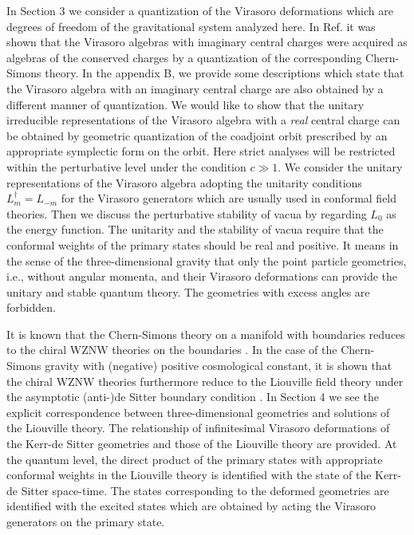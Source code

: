 \documentclass[a4paper,11pt]{article}
\begin{document}
In Section 3 we consider a quantization of the Virasoro deformations 
which are degrees of freedom of the gravitational system 
analyzed here.
In Ref.\cite{Park} it was shown that the Virasoro algebras 
with imaginary central charges were acquired as algebras 
of the conserved charges by a quantization of the corresponding 
Chern-Simons theory.
In the appendix B, we provide some descriptions which state 
that the Virasoro algebra with an imaginary central charge 
are also obtained by a different manner of quantization.
We would like to show that the unitary irreducible representations of 
the Virasoro algebra with a {\it real} central charge can be obtained 
by geometric quantization of the coadjoint orbit prescribed by 
an appropriate symplectic form on the orbit.
Here strict analyses will be restricted within the perturbative level 
under the condition $c\gg 1$.
We consider the unitary representations of the Virasoro algebra 
adopting the unitarity conditions $L_m^\dagger =L_{-m}$ for the Virasoro
generators which are usually used in conformal field theories.
Then we discuss the perturbative stability of vacua 
by regarding $L_0$ as the energy function.
The unitarity and the stability of vacua require that 
the conformal weights of the primary states should be real and
positive. It means in the sense of the three-dimensional gravity that 
only the point particle geometries, i.e., without angular momenta, 
and their Virasoro deformations can provide the unitary and stable 
quantum theory. The geometries with excess angles are forbidden.

It is known that the Chern-Simons theory on a manifold with boundaries 
reduces to the chiral WZNW theories on the boundaries \cite{Elitzur}.
In the case of the Chern-Simons gravity with (negative) positive 
cosmological constant, it is shown that the chiral WZNW theories 
furthermore reduce to the Liouville field theory under the asymptotic 
(anti-)de Sitter boundary condition \cite{CHD-BO, Klemm1}.
In Section 4 we see the explicit correspondence between 
three-dimensional geometries and solutions of the Liouville theory. 
The relationship of infinitesimal Virasoro deformations of 
the Kerr-de Sitter geometries and those of the Liouville theory 
are provided.
At the quantum level, the direct product of the primary states 
with appropriate conformal weights in the Liouville theory 
is identified with the state of the Kerr-de Sitter space-time.
The states corresponding to the deformed geometries are identified 
with the excited states which are obtained by acting the Virasoro
generators on the primary state.
\end{document}
